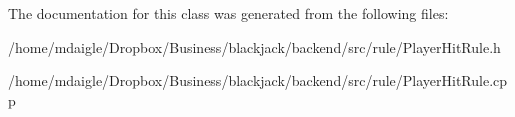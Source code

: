 \-The documentation for this class was generated from the following files\-:\begin{DoxyCompactItemize}
\item 
/home/mdaigle/\-Dropbox/\-Business/blackjack/backend/src/rule/\-Player\-Hit\-Rule.\-h\item 
/home/mdaigle/\-Dropbox/\-Business/blackjack/backend/src/rule/\-Player\-Hit\-Rule.\-cpp\end{DoxyCompactItemize}
